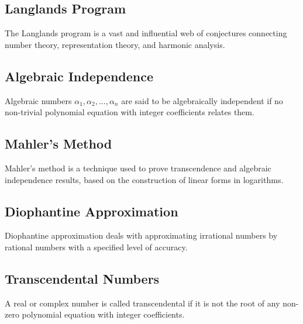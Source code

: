 \documentclass{article}
\begin{document}
\subsection{Langlands Program}

\begin{definition}
The Langlands program is a vast and influential web of conjectures connecting number theory, representation theory, and harmonic analysis.
\end{definition}

\subsection{Algebraic Independence}

\begin{definition}
Algebraic numbers $\alpha_1, \alpha_2, \ldots, \alpha_n$ are said to be algebraically independent if no non-trivial polynomial equation with integer coefficients relates them.
\end{definition}

\subsection{Mahler's Method}

\begin{definition}
Mahler's method is a technique used to prove transcendence and algebraic independence results, based on the construction of linear forms in logarithms.
\end{definition}

\subsection{Diophantine Approximation}

\begin{definition}
Diophantine approximation deals with approximating irrational numbers by rational numbers with a specified level of accuracy.
\end{definition}

\subsection{Transcendental Numbers}

\begin{definition}
A real or complex number is called transcendental if it is not the root of any non-zero polynomial equation with integer coefficients.
\end{definition}
\end{document}
